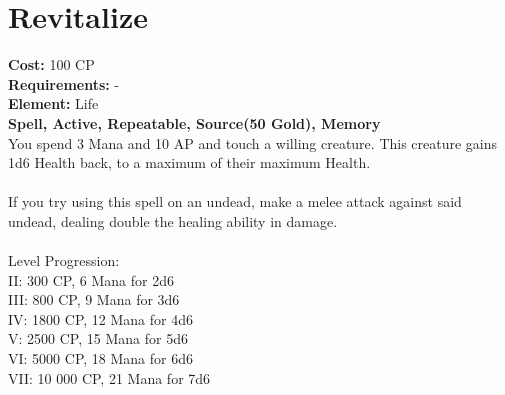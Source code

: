 \section{Revitalize}
\textbf{Cost:} 100 CP\\
\textbf{Requirements:} -\\
\textbf{Element:} Life\\
\textbf{Spell, Active, Repeatable, Source(50 Gold), Memory}\\
You spend 3 Mana and 10 AP and touch a willing creature. This creature gains 1d6 Health back, to a maximum of their maximum Health.\\
\\
If you try using this spell on an undead, make a melee attack against said undead, dealing double the healing ability in damage.\\
\\
Level Progression:\\
II: 300 CP, 6 Mana for 2d6\\
III: 800 CP, 9 Mana for 3d6\\
IV: 1800 CP, 12 Mana for 4d6\\
V: 2500 CP, 15 Mana for 5d6\\
VI: 5000 CP, 18 Mana for 6d6\\
VII: 10 000 CP, 21 Mana for 7d6\\